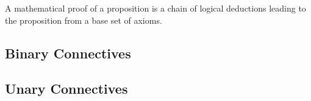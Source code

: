 \begin{definition}
A mathematical proof of a proposition is a chain of logical deductions
leading to the proposition from a base set of axioms.

\end{definition}

\subsection{Binary Connectives}

\subsection{Unary Connectives}

\printbibliography[heading=subbibliography, title={Section 1.1 References}, keyword=chapter1secao1]